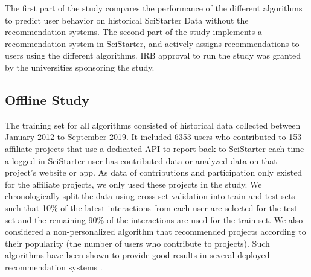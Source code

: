 \documentclass[letterpaper]{article} %
\begin{document}
%  



  
  The first part of the study compares the performance of the different algorithms to predict 
  user behavior on historical 
 SciStarter Data without the recommendation systems.  The second part of the study 
 implements a recommendation system in SciStarter, and 
 actively  assigns recommendations to users using the different algorithms. 
 IRB approval to run the study was granted by the universities sponsoring the study. 
 
 \subsection{Offline Study}
 
 The  training set for all algorithms consisted of historical   data  collected between January 2012 to September 2019. It included 6353 users who contributed to 153 affiliate  projects that use a dedicated  API to report back to SciStarter each time a logged in SciStarter user has contributed data or analyzed data on that project’s website or app. As data of contributions and participation only existed for the affiliate projects, we only used these projects in the study.
We chronologically split the data using cross-set validation into train and test sets such that 10\% of the latest interactions from each user are selected for the test set and the remaining 90\% of the interactions are used for the train set.  
We also considered a non-personalized  algorithm that recommended projects according to their popularity (the number of users who contribute to  projects). Such algorithms have been shown to provide   good results in several deployed 
recommendation systems \cite{ahn2006utilizing,jonnalagedda2016incorporating}.
\end{document}
